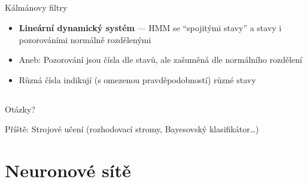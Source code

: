 \documentclass{beamer}
\begin{document}
\subsection{}
\begin{frame}{Kálmánovy filtry}
\begin{itemize}
\item {\bf Lineární dynamický systém} --- HMM se ``spojitými stavy'' a stavy i pozorováními normálně rozdělenými
\item Aneb: Pozorování jsou čísla dle stavů, ale zašuměná dle normálního rozdělení
\item Různá čísla indikují (s omezenou pravděpodobností) různé stavy
\end{itemize}
\end{frame}

\subsection{}
\begin{frame}{Otázky?}
\begin{center}
Příště: Strojové učení (rozhodovací stromy, Bayesovský klasifikátor\dots)
\end{center}
\end{frame}

\section{Neuronové sítě}
\end{document}
